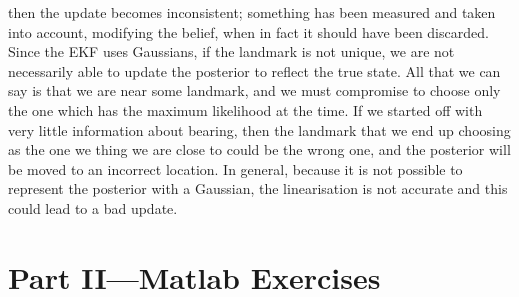 \documentclass[a4paper,12pt]{article}
\begin{document}
\begin{enumerate}[resume]
  then the update becomes inconsistent; something has been measured and taken
  into account, modifying the belief, when in fact it should have been
  discarded. Since the EKF uses Gaussians, if the landmark is not unique, we are
  not necessarily able to update the posterior to reflect the true state. All
  that we can say is that we are near some landmark, and we must compromise to
  choose only the one which has the maximum likelihood at the time. If we
  started off with very little information about bearing, then the landmark that
  we end up choosing as the one we thing we are close to could be the wrong one,
  and the posterior will be moved to an incorrect location. In general, because
  it is not possible to represent the posterior with a Gaussian, the
  linearisation is not accurate and this could lead to a bad update. 
\end{enumerate}
\section{Part II---Matlab Exercises}
\end{document}
